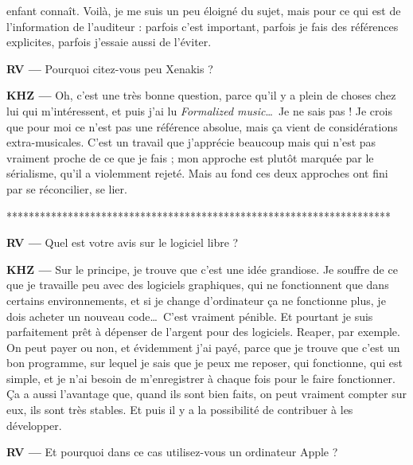 \documentclass[a4paper,12pt]{article}
\begin{document}
enfant connaît. Voilà, je me suis un peu éloigné du sujet, mais pour ce qui est de l'information de l'auditeur : parfois c'est important, parfois je fais des références explicites, parfois j'essaie aussi de l'éviter.

\textbf{RV ---} Pourquoi citez-vous peu Xenakis ?

\textbf{KHZ ---} Oh, c'est une très bonne question, parce qu'il y a plein de choses chez lui qui m'intéressent, et puis j'ai lu \emph{Formalized music}\dots~Je ne sais pas ! Je crois que pour moi ce n'est pas une référence absolue, mais ça vient de considérations extra-musicales. C'est un travail que j'apprécie beaucoup mais qui n'est pas vraiment proche de ce que je fais ; mon approche est plutôt marquée par le sérialisme, qu'il a violemment rejeté. Mais au fond ces deux approches ont fini par se réconcilier, se lier.

*********************************************************************

\textbf{RV ---} Quel est votre avis sur le logiciel libre ?

\textbf{KHZ ---} Sur le principe, je trouve que c'est une idée grandiose. Je souffre de ce que je travaille peu avec des logiciels graphiques, qui ne fonctionnent que dans certains environnements, et si je change d'ordinateur ça ne fonctionne plus, je dois acheter un nouveau code\dots~C'est vraiment pénible. Et pourtant je suis parfaitement prêt à dépenser de l'argent pour des logiciels. Reaper, par exemple. On peut payer ou non, et évidemment j'ai payé, parce que je trouve que c'est un bon programme, sur lequel je sais que je peux me reposer, qui fonctionne, qui est simple, et je n'ai besoin de m'enregistrer à chaque fois pour le faire fonctionner. Ça a aussi l'avantage que, quand ils sont bien faits, on peut vraiment compter sur eux, ils sont très stables. Et puis il y a la possibilité de contribuer à les développer.

\textbf{RV ---} Et pourquoi dans ce cas utilisez-vous un ordinateur Apple ?
\end{document}
